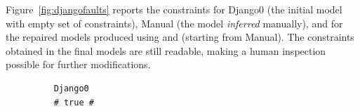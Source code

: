\begin{tikzborder}{\cite{Gargantini16:validation}}
\begin{tikzborder}{\cite{gargantini_combinatorial_2017}}
\begin{tikzborder}{\cite{gargantini_combinatorial_2017}}
Figure~\ref{fig:djangofaults} reports the constraints for \textsf{Django0} (the initial model with empty set of constraints), \textsf{Manual} (the model \emph{inferred} manually), and for the repaired models produced using \cucv and \ValC (starting from \textsf{Manual}). %
The constraints obtained in the final models are still readable, making a human inspection possible for further modifications.  \be


\begin{figure}[h]
	\begin{lstlisting}
	Django0
	# true #
	\end{lstlisting}

\end{figure}
\end{tikzborder}
\end{tikzborder}
\end{tikzborder}
